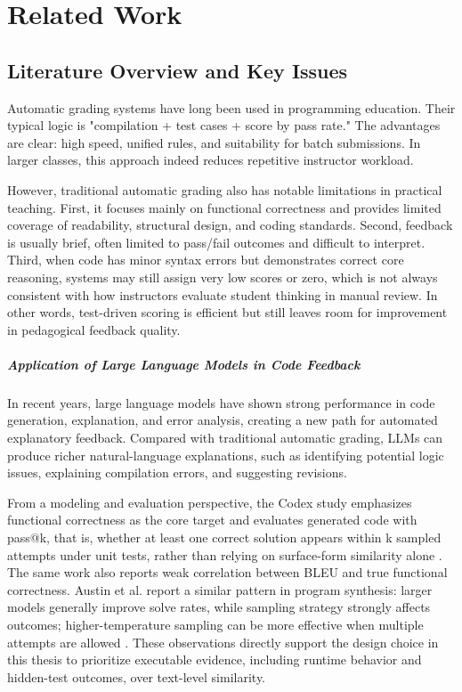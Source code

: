 ﻿\chapter{Related Work}


\section{Literature Overview and Key Issues}

Automatic grading systems have long been used in programming education. Their typical logic is "compilation + test cases + score by pass rate." The advantages are clear: high speed, unified rules, and suitability for batch submissions. In larger classes, this approach indeed reduces repetitive instructor workload.

However, traditional automatic grading also has notable limitations in practical teaching. First, it focuses mainly on functional correctness and provides limited coverage of readability, structural design, and coding standards. Second, feedback is usually brief, often limited to pass/fail outcomes and difficult to interpret. Third, when code has minor syntax errors but demonstrates correct core reasoning, systems may still assign very low scores or zero, which is not always consistent with how instructors evaluate student thinking in manual review. In other words, test-driven scoring is efficient but still leaves room for improvement in pedagogical feedback quality.

\paragraph{Application of Large Language Models in Code Feedback}
In recent years, large language models have shown strong performance in code generation, explanation, and error analysis, creating a new path for automated explanatory feedback. Compared with traditional automatic grading, LLMs can produce richer natural-language explanations, such as identifying potential logic issues, explaining compilation errors, and suggesting revisions.

From a modeling and evaluation perspective, the Codex study emphasizes functional correctness as the core target and evaluates generated code with pass@k, that is, whether at least one correct solution appears within k sampled attempts under unit tests, rather than relying on surface-form similarity alone \cite{ref5_chen2021}. The same work also reports weak correlation between BLEU and true functional correctness. Austin et al. report a similar pattern in program synthesis: larger models generally improve solve rates, while sampling strategy strongly affects outcomes; higher-temperature sampling can be more effective when multiple attempts are allowed \cite{ref6_austin2021}. These observations directly support the design choice in this thesis to prioritize executable evidence, including runtime behavior and hidden-test outcomes, over text-level similarity.

